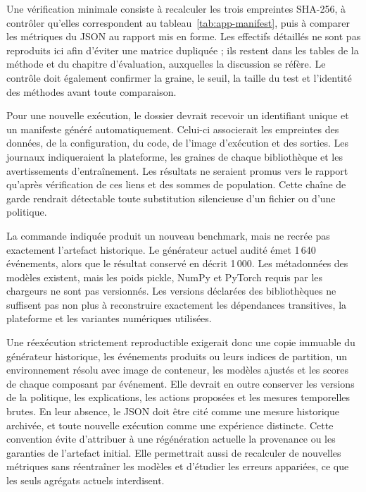 \documentclass[11pt,a4paper,oneside]{report}
\theoremstyle{definition}
\theoremstyle{plain}
\begin{document}
Une vérification minimale consiste à recalculer les trois empreintes SHA-256,
à contrôler qu'elles correspondent au tableau~\ref{tab:app-manifest}, puis à
comparer les métriques du JSON au rapport mis en forme. Les effectifs détaillés
ne sont pas reproduits ici afin d'éviter une matrice dupliquée ; ils restent
dans les tables de la méthode et du chapitre d'évaluation, auxquelles la
discussion se réfère. Le contrôle doit également confirmer la graine, le seuil,
la taille du test et l'identité des méthodes avant toute comparaison.

Pour une nouvelle exécution, le dossier devrait recevoir un identifiant unique
et un manifeste généré automatiquement. Celui-ci associerait les empreintes des
données, de la configuration, du code, de l'image d'exécution et des sorties.
Les journaux indiqueraient la plateforme, les graines de chaque bibliothèque et
les avertissements d'entraînement. Les résultats ne seraient promus vers le
rapport qu'après vérification de ces liens et des sommes de population. Cette
chaîne de garde rendrait détectable toute substitution silencieuse d'un fichier
ou d'une politique.

La commande indiquée produit un nouveau benchmark, mais ne recrée pas
exactement l'artefact historique. Le générateur actuel audité émet 1\,640
événements, alors que le résultat conservé en décrit 1\,000. Les métadonnées des
modèles existent, mais les poids pickle, NumPy et PyTorch requis par les
chargeurs ne sont pas versionnés. Les versions déclarées des bibliothèques ne
suffisent pas non plus à reconstruire exactement les dépendances transitives,
la plateforme et les variantes numériques utilisées.

Une réexécution strictement reproductible exigerait donc une copie immuable du
générateur historique, les événements produits ou leurs indices de partition,
un environnement résolu avec image de conteneur, les modèles ajustés et les
scores de chaque composant par événement. Elle devrait en outre conserver les
versions de la politique, les explications, les actions proposées et les
mesures temporelles brutes. En leur absence, le JSON doit être cité comme une
mesure historique archivée, et toute nouvelle exécution comme une expérience
distincte. Cette convention évite d'attribuer à une régénération actuelle la
provenance ou les garanties de l'artefact initial. Elle permettrait aussi de
recalculer de nouvelles métriques sans réentraîner les modèles et d'étudier les
erreurs appariées, ce que les seuls agrégats actuels interdisent.
\end{document}
